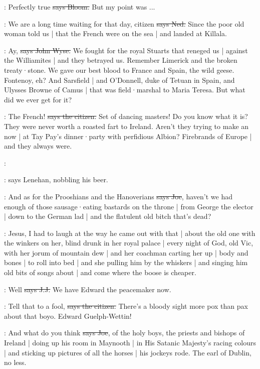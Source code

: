 \Bloom:
Perfectly true
\sout{says Bloom.}
But my point was ...

\lambert:
We are a long time waiting for that day,
citizen
\sout{says Ned.}
Since the poor old woman told us |
that the French were on the sea |
and landed at Killala.

\johnwyse:
Ay,
\sout{says John Wyse.}
We fought for the royal Stuarts that reneged us |
against the Williamites |
and they betrayed us.
Remember Limerick and the broken treaty·stone.
We gave our best blood to France and Spain,
the wild geese.
\stage[cheers]
Fontenoy,
eh?
And Sarsfield |
and O'Donnell,
duke of Tetuan in Spain,
and Ulysses Browne of Camus |
that was field·marshal to Maria Teresa.
But what did we ever get for it?

\citizen:
The French!
\sout{says the citizen.}
Set of dancing masters!
Do you know what it is?
They were never worth a roasted fart to Ireland.
Aren't they trying to make an  now |
at Tay Pay's dinner·party with perfidious Albion?
Firebrands of Europe |
and they always were.

\lenehan:

\Nq:
says Lenehan,
nobbling his beer.

\joe:
And as for the Prooshians and the Hanoverians
\sout{says Joe},
haven't we had enough of those sausage·eating bastards on the throne |
from George the elector |
down to the German lad |
and the flatulent old bitch that's dead?

\Nq:
Jesus,
I had to laugh at the way he came out with that |
about the old one with the winkers on her,
blind drunk in her royal palace |
every night of God,
old Vic,
with her jorum of mountain dew |
and her coachman carting her up |
body and bones |
to roll into bed |
and she pulling him by the whiskers |
and singing him old bits of songs about  |
and come where the boose is cheaper.

\jjom:
Well
\sout{says J.J.}
We have Edward the peacemaker now.

\citizen:
Tell that to a fool,
\sout{says the citizen.}
There's a bloody sight more pox than pax about that boyo.
Edward Guelph-Wettin!

\joe:
And what do you think
\sout{says Joe},
of the holy boys,
the priests and bishops of Ireland |
doing up his room in Maynooth |
in His Satanic Majesty's racing colours |
and sticking up pictures of all the horses |
his jockeys rode.
The earl of Dublin,
no less.

